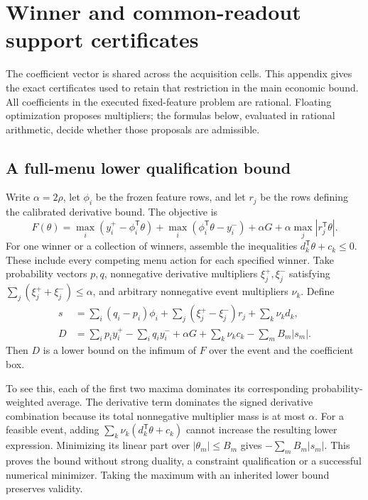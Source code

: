 \section{Winner and common-readout support certificates}\label{app:compatible84}
The coefficient vector is shared across the acquisition cells. This appendix gives the exact certificates used to retain that restriction in the main economic bound. All coefficients in the executed fixed-feature problem are rational. Floating optimization proposes multipliers; the formulas below, evaluated in rational arithmetic, decide whether those proposals are admissible.

\subsection{A full-menu lower qualification bound}
Write $\alpha=2\rho$, let $\phi_i$ be the frozen feature rows, and let $r_j$ be the rows defining the calibrated derivative bound. The objective is
\[
 F(\theta)=\max_i(y_i^+-\phi_i^{\mathsf T}\theta)
        +\max_i(\phi_i^{\mathsf T}\theta-y_i^-)
        +\alpha G+\alpha\max_j|r_j^{\mathsf T}\theta|.
\]
For one winner or a collection of winners, assemble the inequalities
$d_k^{\mathsf T}\theta+c_k\le0$. These include every competing menu action for each specified winner. Take probability vectors $p,q$, nonnegative derivative multipliers $\xi_j^+,\xi_j^-$ satisfying
$\sum_j(\xi_j^++\xi_j^-)\le\alpha$, and arbitrary nonnegative event multipliers $\nu_k$. Define
\begin{align*}
 s&=\sum_i(q_i-p_i)\phi_i
       +\sum_j(\xi_j^+-\xi_j^-)r_j+\sum_k\nu_kd_k,\\
 D&=\sum_ip_i y_i^+-\sum_iq_i y_i^-+\alpha G
                       +\sum_k\nu_kc_k-\sum_mB_m|s_m|.
\end{align*}
Then $D$ is a lower bound on the infimum of $F$ over the event and the coefficient box.

To see this, each of the first two maxima dominates its corresponding probability-weighted average. The derivative term dominates the signed derivative combination because its total nonnegative multiplier mass is at most $\alpha$. For a feasible event, adding $\sum_k\nu_k(d_k^{\mathsf T}\theta+c_k)$ cannot increase the resulting lower expression. Minimizing its linear part over $|\theta_m|\le B_m$ gives $-\sum_m B_m|s_m|$. This proves the bound without strong duality, a constraint qualification or a successful numerical minimizer. Taking the maximum with an inherited lower bound preserves validity.

